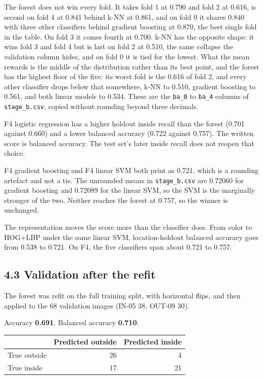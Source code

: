 \documentclass[11pt,a4paper]{article}
\newcounter{none}
\begin{document}
The forest does not win every fold. It takes fold 1 at 0.790 and fold 2 at 0.616, is second on fold 4 at 0.841 behind k-NN at 0.861, and on fold 0 it shares 0.840 with three other classifiers behind gradient boosting at 0.870, the best single fold in the table. On fold 3 it comes fourth at 0.700. k-NN has the opposite shape: it wins fold 3 and fold 4 but is last on fold 2 at 0.510, the same collapse the validation column hides, and on fold 0 it is tied for the lowest. What the mean rewards is the middle of the distribution rather than its best point, and the forest has the highest floor of the five: its worst fold is the 0.616 of fold 2, and every other classifier drops below that somewhere, k-NN to 0.510, gradient boosting to 0.561, and both linear models to 0.534. These are the \texttt{ba\_\allowbreak{}0} to \texttt{ba\_\allowbreak{}4} columns of \texttt{stage\_\allowbreak{}b.csv}, copied without rounding beyond three decimals.

F4 logistic regression has a higher holdout inside recall than the forest (0.701 against 0.660) and a lower balanced accuracy (0.722 against 0.757). The written score is balanced accuracy. The test set's later inside recall does not reopen that choice.

F4 gradient boosting and F4 linear SVM both print as 0.721, which is a rounding artefact and not a tie. The unrounded means in \texttt{stage\_\allowbreak{}b.csv} are 0.72060 for gradient boosting and 0.72089 for the linear SVM, so the SVM is the marginally stronger of the two. Neither reaches the forest at 0.757, so the winner is unchanged.

The representation moves the score more than the classifier does. From color to HOG+LBP under the same linear SVM, location-holdout balanced accuracy goes from 0.538 to 0.721. On F4, the five classifiers span about 0.721 to 0.757.

\subsection{4.3 Validation after the refit}\label{validation-after-the-refit}

The forest was refit on the full training split, with horizontal flips, and then applied to the 68 validation images (IN-05 38, OUT-09 30).

Accuracy \textbf{0.691}. Balanced accuracy \textbf{0.710}.

{\def\LTcaptype{none} %
\begin{longtable}[]{@{}lrr@{}}
\toprule\noalign{}
& Predicted outside & Predicted inside \\
\midrule\noalign{}
\endhead
\bottomrule\noalign{}
\endlastfoot
True outside & 26 & 4 \\
True inside & 17 & 21 \\
\end{longtable}
}
\end{document}
